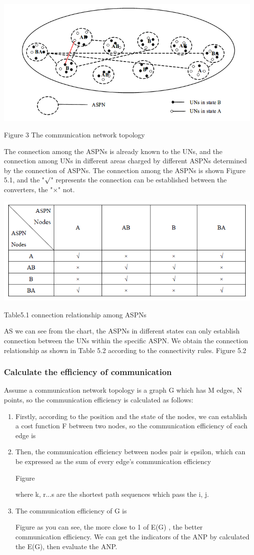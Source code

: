\documentclass{article}
\begin{document}
\centerline{\includegraphics[width=.6\textwidth]{Figure3.png}}
\centerline{Figure 3 The communication network topology }


The connection among the ASPNs is already known to the UNs, and the connection among UNs in different areas charged by different
ASPNs determined by the connection of ASPNs. The connection among the ASPNs is shown Figure 5.1, and the "\(\surd\)" represents the
connection can be established between the converters, the "\(\times\)" not.
\par
\centerline{\includegraphics[width=.7\textwidth]{Table1.png}}
\centerline{Table5.1 connection relationship among ASPNs}

AS we can see from the chart, the ASPNs in different states can only establish connection between the UNs within the specific ASPN.
We obtain the connection relationship as shown in Table 5.2 according to the connectivity rules.
Figure 5.2

\subsubsection{Calculate the efficiency of communication}
Assume a communication network topology is a graph G which has M edges, N points, so the communication efficiency is calculated as follows:
\begin{enumerate}
    \item Firstly,  according to the position and the state of the nodes, we can establish a cost function F between two nodes,
    so the communication efficiency of each edge is
    \item Then, the communication efficiency between nodes pair is epsilon, which can be expressed as the sum of every edge's
    communication efficiency

    Figure

    where k, r...s are the shortest path sequences which pass the i, j.
    \item The communication efficiency of G is

    Figure
    as you can see, the more close to 1 of E(G) , the better communication efficiency. We can get the indicators of the ANP by calculated the E(G), then evaluate the ANP.

\end{enumerate}
\end{document}
